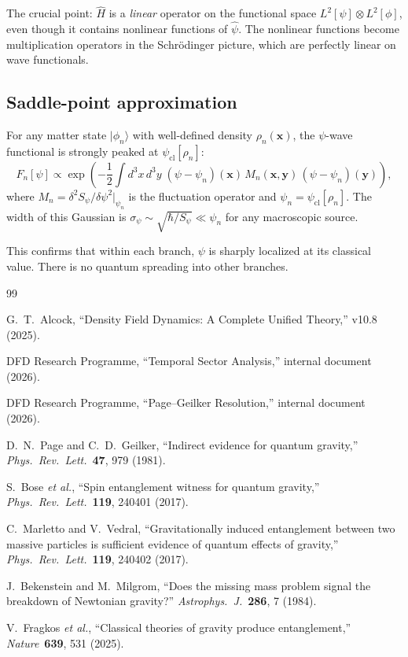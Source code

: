 \documentclass[12pt,a4paper]{article}
\begin{document}
The crucial point: $\hat{H}$ is a \emph{linear} operator on the
functional space $L^2[\psi] \otimes L^2[\phi]$, even though it
contains nonlinear functions of $\hat\psi$. The nonlinear functions
become multiplication operators in the Schr\"odinger picture, which
are perfectly linear on wave functionals.

\subsection{Saddle-point approximation}

For any matter state $|\phi_n\rangle$ with well-defined density
$\rho_n(\mathbf{x})$, the $\psi$-wave functional is strongly peaked
at $\psi_\mathrm{cl}[\rho_n]$:
\begin{equation}
F_n[\psi] \propto \exp\!\left(
-\frac{1}{2}\int d^3x\,d^3y\;
(\psi - \psi_n)(\mathbf{x})\,
M_n(\mathbf{x},\mathbf{y})\,
(\psi - \psi_n)(\mathbf{y})
\right),
\end{equation}
where $M_n = \delta^2 S_\psi/\delta\psi^2|_{\psi_n}$ is the fluctuation
operator and $\psi_n = \psi_\mathrm{cl}[\rho_n]$. The width of this
Gaussian is $\sigma_\psi \sim \sqrt{\hbar/S_\psi} \ll \psi_n$ for any
macroscopic source.

This confirms that within each branch, $\psi$ is sharply localized at
its classical value. There is no quantum spreading into other branches.


\begin{thebibliography}{99}

G.~T.~Alcock, ``Density Field Dynamics: A Complete Unified Theory,''
v10.8 (2025).

DFD Research Programme, ``Temporal Sector Analysis,'' internal document
(2026).

DFD Research Programme, ``Page--Geilker Resolution,'' internal document
(2026).

D.~N.~Page and C.~D.~Geilker,
``Indirect evidence for quantum gravity,''
\textit{Phys.~Rev.~Lett.}~\textbf{47}, 979 (1981).

S.~Bose \textit{et al.},
``Spin entanglement witness for quantum gravity,''
\textit{Phys.~Rev.~Lett.}~\textbf{119}, 240401 (2017).

C.~Marletto and V.~Vedral,
``Gravitationally induced entanglement between two massive particles is
sufficient evidence of quantum effects of gravity,''
\textit{Phys.~Rev.~Lett.}~\textbf{119}, 240402 (2017).

J.~Bekenstein and M.~Milgrom,
``Does the missing mass problem signal the breakdown of Newtonian gravity?''
\textit{Astrophys.~J.}~\textbf{286}, 7 (1984).

V.~Fragkos \textit{et al.},
``Classical theories of gravity produce entanglement,''
\textit{Nature}~\textbf{639}, 531 (2025).

\end{thebibliography}
\end{document}
